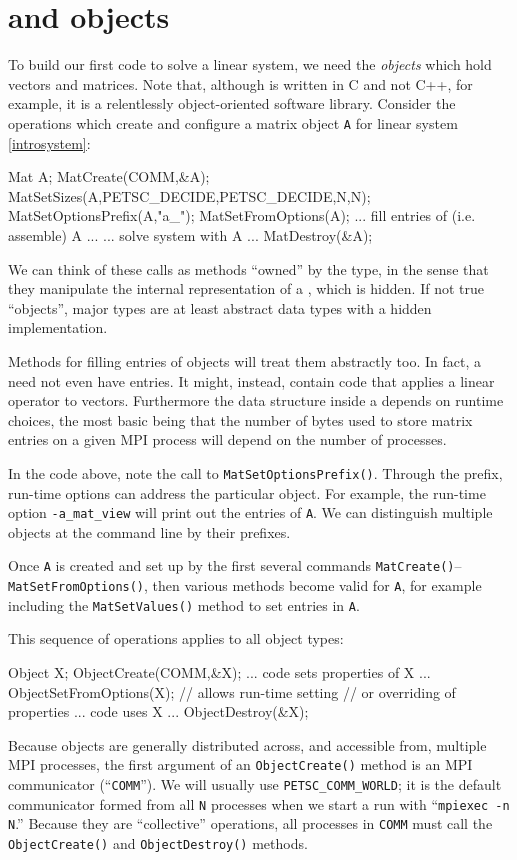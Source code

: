 \section{\PETSc \pVec and \pMat objects}

To build our first \PETSc code to solve a linear system, we need the \emph{objects} which hold vectors and matrices.  Note that, although \PETSc is written in C and not C++, for example, it is a relentlessly object-oriented software library.  Consider the operations which create and configure a matrix object \texttt{A} for linear system \eqref{introsystem}:
\begin{code}
Mat A;
MatCreate(COMM,&A);
MatSetSizes(A,PETSC_DECIDE,PETSC_DECIDE,N,N);
MatSetOptionsPrefix(A,"a_");
MatSetFromOptions(A);
... fill entries of (i.e. assemble) A ...
... solve system with A ...
MatDestroy(&A);
\end{code}
We can think of these calls as methods ``owned'' by the \pMat type, in the sense that they manipulate the internal representation of a \pMat, which is hidden.  If not true ``objects'', major \PETSc types are at least abstract data types with a hidden implementation.

Methods for filling entries of \pMat objects will treat them abstractly too.  In fact, a \pMat need not even have entries.  It might, instead, contain code that applies a linear operator to vectors.  Furthermore the data structure inside a \pMat depends on runtime choices, the most basic being that the number of bytes used to store matrix entries on a given MPI process will depend on the number of processes.

In the code above, note the call to \texttt{MatSetOptionsPrefix()}.  Through the prefix, run-time options can address the particular \pMat object.  For example, the run-time option \texttt{-a\_mat\_view} will print out the entries of \texttt{A}.  We can distinguish multiple \pMat objects at the command line by their prefixes.

Once \pMat \texttt{A} is created and set up by the first several commands \texttt{MatCreate()}--\texttt{MatSetFromOptions()}, then various methods become valid for \texttt{A}, for example including the \texttt{MatSetValues()} method to set entries in \texttt{A}.
 
This sequence of operations applies to all \PETSc object types:
\begin{code}
Object X;
ObjectCreate(COMM,&X);
... code sets properties of X ...
ObjectSetFromOptions(X);  // allows run-time setting
                          // or overriding of properties
... code uses X ...
ObjectDestroy(&X);
\end{code}
Because \PETSc objects are generally distributed across, and accessible from, multiple MPI processes, the first argument of an \texttt{ObjectCreate()} method is an MPI communicator (``\texttt{COMM}'').  We will usually use \texttt{PETSC\_COMM\_WORLD}; it is the default communicator formed from all \texttt{N} processes when we start a run with ``\texttt{mpiexec -n N}.''  Because they are ``collective'' operations, all processes in \texttt{COMM} must call the \texttt{ObjectCreate()} and  \texttt{ObjectDestroy()} methods.


